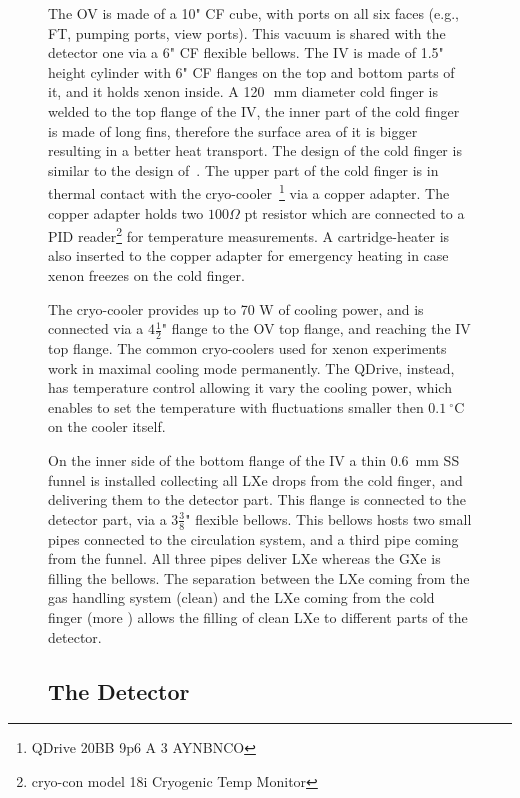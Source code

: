 \begin{figure}[h]
The OV is made of a 10" CF cube, with ports on all six faces (e.g., FT, pumping ports, 
view ports). This vacuum is shared with the detector one via a 6" CF flexible bellows.
The IV is made of 1.5" height cylinder with 6" CF flanges on the top and bottom parts of it, 
and it holds xenon inside. A 120~\,mm diameter cold finger is welded to the top flange of the IV, 
the inner part of the cold finger is made of long fins, therefore the surface area of it is bigger 
resulting in a better heat transport. The design of the cold finger is similar to the design 
of~\cite{xe100_instr2012}. The upper part of the cold finger is in thermal contact with the 
cryo-cooler~\footnote{QDrive 20BB 9p6 A 3 AYNBNCO} via a copper adapter. The copper adapter 
holds two $100\Omega$ pt resistor which are connected to a PID reader\footnote{cryo-con model 
18i Cryogenic Temp Monitor} for temperature measurements. A cartridge-heater 
is also inserted to the copper adapter for emergency heating in case xenon freezes on the 
cold finger. 

The cryo-cooler provides up to 70 W of cooling power, and is connected via a $4\frac{1}{2}$" 
flange to the OV top flange, and reaching the IV top flange. The common cryo-coolers used for 
xenon experiments work in maximal cooling mode permanently. The QDrive, instead, has 
temperature control allowing it vary the cooling power, which enables to set the temperature 
with fluctuations smaller then $0.1~\mathrm{^{\circ}C}$ on the cooler itself.

On the inner side of the bottom flange of the IV a thin 0.6~mm SS funnel is installed 
collecting all LXe drops from the cold finger, and delivering them to the  detector part. 
This flange is connected to the detector part, via a $3\frac{3}{8}$" flexible bellows. This 
bellows hosts two small pipes connected to the circulation system, and a third pipe coming 
from the funnel. All three pipes deliver LXe whereas the GXe is filling the bellows. The 
separation between the LXe coming from the gas handling system (clean) and the LXe coming 
from the cold finger (more ) allows the filling of clean LXe to 
different parts of 
the detector. 

\subsection{The Detector}
\label{subsec:det}
 

\end{figure}

